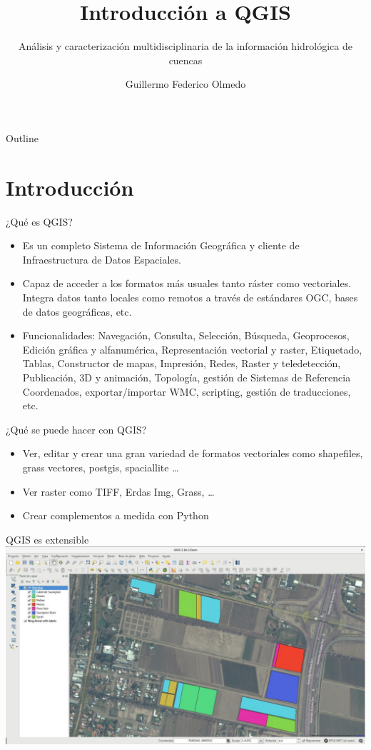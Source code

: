 \documentclass{beamer}
\title[QGIS]{Introducción a QGIS}
\subtitle[]{Análisis y caracterización multidisciplinaria de la información hidrológica de cuencas}
\author[G.F. Olmedo]{Guillermo Federico Olmedo}
\begin{document}
\begin{frame}[plain]
  \titlepage
\end{frame}

\begin{frame}{Outline}
	\tableofcontents[pausesections]
\end{frame}

\section{Introducción}

\begin{frame}{¿Qué es QGIS?}
	\begin{itemize}[<+->]
		\item Es un completo Sistema de Información Geográfica y cliente de Infraestructura de Datos Espaciales.
		\item Capaz de acceder a los formatos más usuales tanto ráster como vectoriales. Integra datos tanto locales como remotos a través de estándares OGC, bases de datos geográficas, etc.
		\item Funcionalidades: Navegación, Consulta, Selección, Búsqueda, Geoprocesos, Edición gráfica y alfanumérica, Representación vectorial y raster, Etiquetado, Tablas, Constructor de mapas, Impresión, Redes, Raster y teledetección, Publicación, 3D y animación, Topología, gestión de Sistemas de Referencia Coordenados, exportar/importar WMC, scripting, gestión de traducciones, etc.
	\end{itemize}
\end{frame}

\begin{frame}{¿Qué se puede hacer con QGIS?}
	\begin{itemize}[<+->]
		\item Ver, editar y crear una gran variedad de formatos vectoriales como shapefiles, grass vectores, postgis, spaciallite \ldots
		\item Ver raster como TIFF, Erdas Img, Grass, \ldots
		\item Crear complementos a medida con Python
	\end{itemize}
\end{frame}

\begin{frame}{QGIS es extensible}
	\centering
	\includegraphics[width=1\textwidth]{IMGs/QGIS+bing}
\end{frame}
\end{document}
